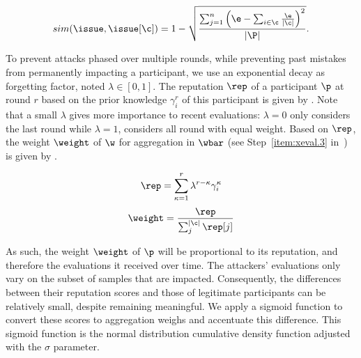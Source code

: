\begin{equation}\label{eq:sim_reput}
  sim(\issue,\issue[\c]) = 1 - \sqrt{
    \frac{
      \sum_{j=1}^{n}{
        {\left(\e - \sum_{i \in \c} \frac{\e}{|\c|}\right)}^{2}
      }
    }
    {
      |\P|
    }
  }.
\end{equation}


To prevent attacks phased over multiple rounds, while preventing past mistakes from permanently impacting a participant, we use an exponential decay as forgetting factor, noted $\lambda \in [0,1]$. The reputation $\rep$ of a participant $\p$ at round $r$ based on the prior knowledge $\gamma^r_i$ of this participant is given by .
Note that a small $\lambda$ gives more importance to recent evaluations: $\lambda=0$ only considers the last round while $\lambda=1$, considers all round with equal weight.  
Based on $\rep$, the weight $\weight$ of $\w$ for aggregation in $\wbar$ (see Step~\ref{item:xeval.3} in~) is given by .

\begin{multicols}{2}
  \begin{equation}\label{eq:reputation_history}
    \rep = \sum_{\kappa=1}^{r}\lambda^{r-\kappa}\gamma_i^{\kappa}
  \end{equation}\break
  \begin{equation}\label{eq:weight_computation}
    \weight = \frac{\rep}{\sum_{j}^{|\c|}\rep[j]}
  \end{equation}
\end{multicols}

As such, the weight $\weight$ of $\p$ will be proportional to its reputation, and therefore the evaluations it received over time.
The attackers' evaluations only vary on the subset of samples that are impacted. 
Consequently, the differences between their reputation scores and those of legitimate participants can be relatively small, despite remaining meaningful. 
We apply a sigmoid function to convert these scores to aggregation weighs and accentuate this difference.
This sigmoid function is the normal distribution cumulative density function adjusted with the $\sigma$ parameter.
